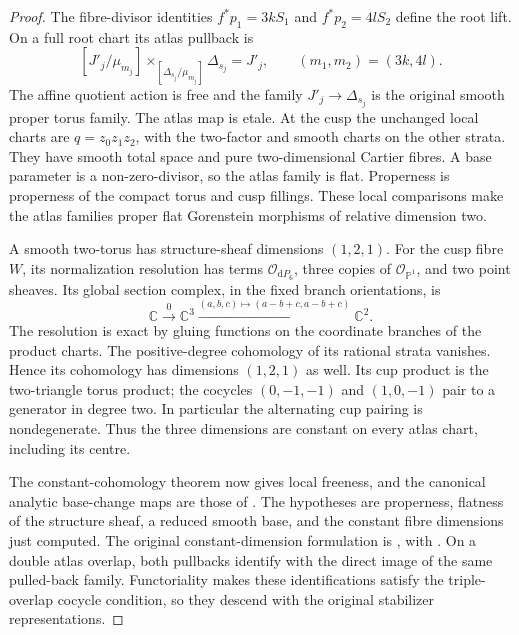 \begin{proof}
The fibre-divisor identities $f^*p_1=3kS_1$ and $f^*p_2=4lS_2$
define the root lift. On a full root chart its atlas pullback is
\[
 [J'_j/\mu_{m_j}]
 \mathbin{\times_{[\Delta_{s_j}/\mu_{m_j}]}}
 \Delta_{s_j}=J'_j,
 \qquad (m_1,m_2)=(3k,4l).
\]
The affine quotient action is free and the family $J'_j\to\Delta_{s_j}$
is the original smooth proper torus family. The atlas map is etale.
At the cusp the unchanged local charts are $q=z_0z_1z_2$, with the
two-factor and smooth charts on the other strata. They have smooth
total space and pure two-dimensional Cartier fibres. A base parameter
is a non-zero-divisor, so the atlas family is flat. Properness is
properness of the compact torus and cusp fillings. These local
comparisons make the atlas families proper flat Gorenstein morphisms
of relative dimension two.

A smooth two-torus has structure-sheaf dimensions $(1,2,1)$.
For the cusp fibre $W$, its normalization resolution has terms
$\mathcal O_{\mathrm dP_6}$, three copies of
$\mathcal O_{\mathbb P^1}$, and two point sheaves. Its global
section complex, in the fixed branch orientations, is
\[
 \mathbb C\xrightarrow{0}\mathbb C^3
 \xrightarrow{(a,b,c)\mapsto(a-b+c,a-b+c)}\mathbb C^2.
\]
The resolution is exact by gluing functions on the coordinate
branches of the product charts. The positive-degree cohomology of
its rational strata vanishes. Hence its cohomology has dimensions
$(1,2,1)$ as well. Its cup product is the two-triangle torus product;
the cocycles $(0,-1,-1)$ and $(1,0,-1)$ pair to a generator in
degree two. In particular the alternating cup pairing is
nondegenerate. Thus the three dimensions are constant on every
atlas chart, including its centre.

The constant-cohomology theorem
\cite[Chapter III, Theorem 4.12(ii), pp.~134--135]{BS76}
now gives local freeness, and the canonical analytic base-change
maps are those of
\cite[Chapter III, Theorem 4.10, pp.~132--133]{BS76}.
The hypotheses are properness, flatness of the structure sheaf,
a reduced smooth base, and the constant fibre dimensions just
computed. The original constant-dimension formulation is
\cite[Section 7, Satz 5, pp.~63--64]{Grauert1960D}, with
\cite[pp.~35--36]{Grauert1963ErratumD}.
On a double atlas overlap, both pullbacks identify with the direct
image of the same pulled-back family. Functoriality makes these
identifications satisfy the triple-overlap cocycle condition, so
they descend with the original stabilizer representations.


\end{proof}
